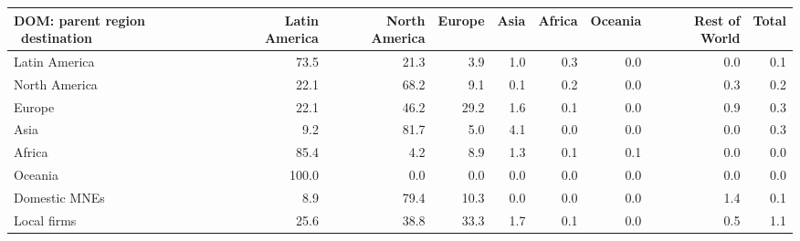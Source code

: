 \begin{tabular}{lrrrrrrrr}
\toprule
DOM: parent region \ destination & Latin America & North America & Europe & Asia & Africa & Oceania & Rest of World & Total \\
\midrule
Latin America & 73.5 & 21.3 & 3.9 & 1.0 & 0.3 & 0.0 & 0.0 & 0.1 \\
North America & 22.1 & 68.2 & 9.1 & 0.1 & 0.2 & 0.0 & 0.3 & 0.2 \\
Europe & 22.1 & 46.2 & 29.2 & 1.6 & 0.1 & 0.0 & 0.9 & 0.3 \\
Asia & 9.2 & 81.7 & 5.0 & 4.1 & 0.0 & 0.0 & 0.0 & 0.3 \\
Africa & 85.4 & 4.2 & 8.9 & 1.3 & 0.1 & 0.1 & 0.0 & 0.0 \\
Oceania & 100.0 & 0.0 & 0.0 & 0.0 & 0.0 & 0.0 & 0.0 & 0.0 \\
Domestic MNEs & 8.9 & 79.4 & 10.3 & 0.0 & 0.0 & 0.0 & 1.4 & 0.1 \\
Local firms & 25.6 & 38.8 & 33.3 & 1.7 & 0.1 & 0.0 & 0.5 & 1.1 \\
\bottomrule
\end{tabular}
